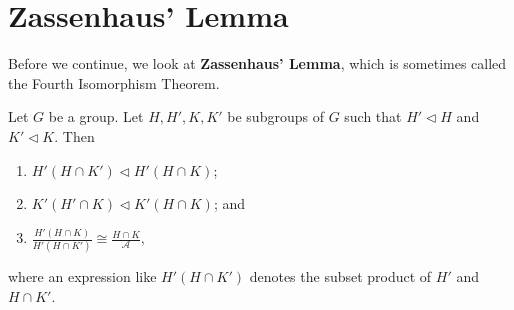\section{Zassenhaus' Lemma}
Before we continue, we look at \textbf{Zassenhaus' Lemma}, which is sometimes called the Fourth Isomorphism Theorem.
\begin{lemma}[Zassenhaus]\label{lemma-zassenhaus}
    Let $G$ be a group. Let $H, H', K, K'$ be subgroups of $G$ such that $H' \lhd H$ and $K' \lhd K$. Then
    \begin{enumerate}
        \item $H'(H \cap K') \lhd H' (H \cap K)$;
        \item $K'(H' \cap K) \lhd K' (H \cap K)$; and
        \item $\frac{H'(H\cap K)}{H'(H\cap K')} \cong \frac{H\cap K}{\mathcal{A}}$,
    \end{enumerate}
    where an expression like $H'(H \cap K')$ denotes the subset product of $H'$ and $H \cap K'$.
\end{lemma}
